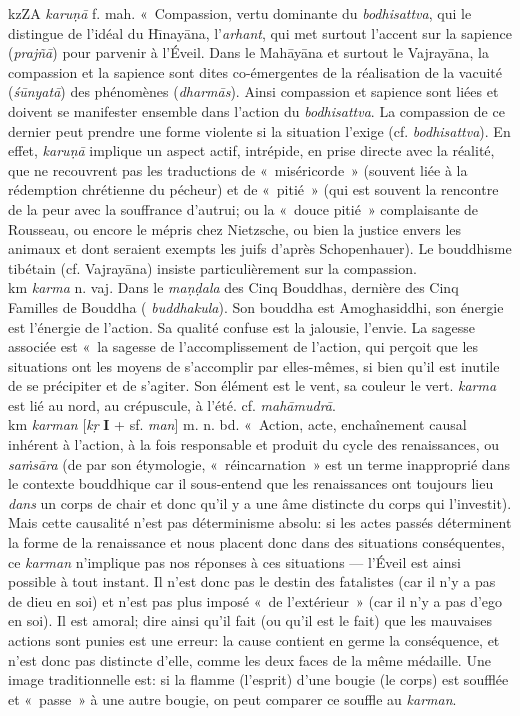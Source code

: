 \documentclass[a4paper,11pt,twocolumn]{article}
\begin{document}
{\dn kzZA} {\em karu\d{n}\={a}} f. mah. «~Compassion\fg, vertu
dominante du {\em bodhisattva}, qui le distingue de l'idéal du
H\={\i}nay\={a}na, l'{\em arhant}, qui met surtout l'accent sur la
sapience ({\em prajñ\={a}}) pour parvenir à l'Éveil. Dans le
Mah\={a}y\={a}na et surtout le Vajray\={a}na, la compassion et la
sapience sont dites co-émergentes de la réalisation de la vacuité
({\em \'{s}\={u}nyat\={a}}) des phénomènes ({\em dharm\={a}s}). Ainsi
compassion et sapience
sont liées et doivent se manifester ensemble dans l'action du {\em
bodhisattva}. La compassion de ce dernier peut prendre une forme
violente si la situation l'exige (cf. {\em bodhisattva}). En effet,
{\em karu\d{n}\={a}} implique un aspect actif, intrépide, en prise
directe avec la réalité, que ne recouvrent pas les traductions de
«~miséricorde~» (souvent liée à la rédemption chrétienne du pécheur)
et de «~pitié~» (qui est souvent la rencontre de la peur avec la
souffrance d'autrui; ou la «~douce pitié~» complaisante de Rousseau,
ou encore le mépris chez Nietzsche, ou bien la justice envers les
animaux et dont seraient exempts les juifs d'après Schopenhauer). Le
bouddhisme tibétain (cf.  Vajray\={a}na) insiste particulièrement sur
la compassion. \\

{\dn km\0} {\em karma} n. vaj. Dans le {\em ma\d{n}\d{d}ala} des Cinq
Bouddhas, dernière des Cinq Familles de Bouddha ({\em
buddhakula}). Son bouddha est Amoghasiddhi, son énergie est l'énergie
de l'action. Sa qualité confuse est la jalousie, l'envie. La sagesse
associée est «~la sagesse de l'accomplissement de l'action\fg, qui
per\c{c}oit que les situations ont les moyens de s'accomplir par
elles-mêmes, si bien qu'il est inutile de se précipiter et de
s'agiter. Son élément est le vent, sa couleur le vert. {\em karma} est
lié au nord, au crépuscule, à l'été. cf. {\em mah\={a}mudr\={a}}. \\

{\dn km\0} {\em karman} [{\em k\d{r}} {\bf I} + sf. {\em man}]
m. n. bd. «~Action, acte\fg, enchaînement causal inhérent à l'action,
à la fois responsable et produit du cycle des renaissances, ou {\em
sa\.{m}s\={a}ra} (de par son étymologie, «~réincarnation~» est un
terme inapproprié dans le contexte bouddhique car il sous-entend que
les renaissances ont toujours lieu {\em dans} un corps de chair et
donc qu'il y a une âme distincte du corps qui l'investit). Mais cette
causalité n'est pas déterminisme absolu: si les actes passés
déterminent la forme de la  renaissance et nous placent donc dans des
situations conséquentes, ce {\em karman} n'implique pas nos réponses à
ces situations --- l'Éveil est ainsi possible à tout instant. Il n'est
donc pas le destin des fatalistes (car il n'y a pas de dieu en soi) et
n'est pas plus imposé «~de l'extérieur~» (car il n'y a pas d'ego en
soi). Il est amoral; dire ainsi qu'il fait (ou qu'il est le fait) que
les mauvaises actions sont punies est une erreur: la cause contient en
germe la  conséquence, et n'est donc pas distincte d'elle, comme les
deux faces de la même médaille. Une image traditionnelle est: si la
flamme (l'esprit) d'une bougie (le corps) est soufflée et «~passe~» à
une autre bougie, on peut comparer ce souffle au {\em karman}.
\end{document}

